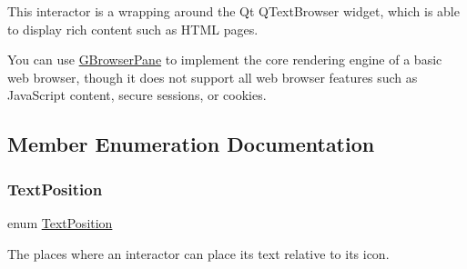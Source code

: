 This interactor is a wrapping around the Qt Q\+Text\+Browser widget, which is able to display rich content such as H\+T\+ML pages.

You can use \mbox{\hyperlink{classGBrowserPane}{G\+Browser\+Pane}} to implement the core rendering engine of a basic web browser, though it does not support all web browser features such as Java\+Script content, secure sessions, or cookies. 

\subsection{Member Enumeration Documentation}
\mbox{\label{classGInteractor_a8e0d441725a81d2bbdebbea09078260e}} 
\subsubsection{\texorpdfstring{Text\+Position}{TextPosition}}
{\footnotesize\ttfamily enum \mbox{\hyperlink{classGInteractor_a8e0d441725a81d2bbdebbea09078260e}{Text\+Position}}\hspace{0.3cm}{\ttfamily [inherited]}}



The places where an interactor can place its text relative to its icon. 

